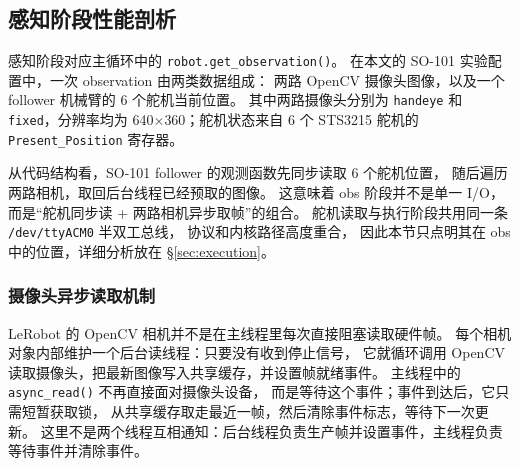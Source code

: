 \subsection{感知阶段性能剖析}\label{sec:perception}

感知阶段对应主循环中的 \texttt{robot.get\_observation()}。
在本文的 SO-101 实验配置中，一次 observation 由两类数据组成：
两路 OpenCV 摄像头图像，以及一个 follower 机械臂的 6 个舵机当前位置。
其中两路摄像头分别为 \texttt{handeye} 和 \texttt{fixed}，分辨率均为
640$\times$360；舵机状态来自 6 个 STS3215 舵机的
\texttt{Present\_Position} 寄存器。

从代码结构看，SO-101 follower 的观测函数先同步读取 6 个舵机位置，
随后遍历两路相机，取回后台线程已经预取的图像。
这意味着 obs 阶段并不是单一 I/O，而是“舵机同步读 + 两路相机异步取帧”的组合。
舵机读取与执行阶段共用同一条 \texttt{/dev/ttyACM0} 半双工总线，
协议和内核路径高度重合，
因此本节只点明其在 obs 中的位置，详细分析放在 \S\ref{sec:execution}。

\subsubsection{摄像头异步读取机制}

LeRobot 的 OpenCV 相机并不是在主线程里每次直接阻塞读取硬件帧。
每个相机对象内部维护一个后台读线程：只要没有收到停止信号，
它就循环调用 OpenCV 读取摄像头，把最新图像写入共享缓存，并设置帧就绪事件。
主线程中的 \texttt{async\_read()} 不再直接面对摄像头设备，
而是等待这个事件；事件到达后，它只需短暂获取锁，
从共享缓存取走最近一帧，然后清除事件标志，等待下一次更新。
这里不是两个线程互相通知：后台线程负责生产帧并设置事件，主线程负责等待事件并清除事件。

